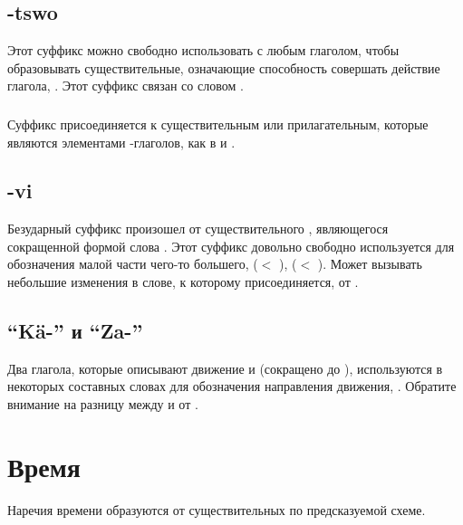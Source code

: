 \subsection{-tswo} Этот суффикс можно свободно использовать с любым глаголом, чтобы образовывать существительные, означающие способность совершать действие глагола,
   .
Этот суффикс связан со словом  .

\subsubsection{} Суффикс  присоединяется к существительным или прилагательным, которые являются элементами -глаголов, как в   и  .

\subsection{-vi}  Безударный суффикс  произошел от существительного , являющегося сокращенной формой слова  . Этот суффикс довольно свободно используется для обозначения малой части чего-то большего,
  ($<$  ), 
 ($<$  ).  Может вызывать небольшие изменения в слове, к которому присоединяется, 
 от  .

\subsection{``Kä-'' и ``Za-''} Два глагола, которые описывают движение  
и   (сокращено до ), используются в некоторых составных словах для обозначения направления движения, 
.  Обратите внимание на разницу между  
и   от  .


\section{Время}
\noindent Наречия времени образуются от существительных по предсказуемой схеме.

